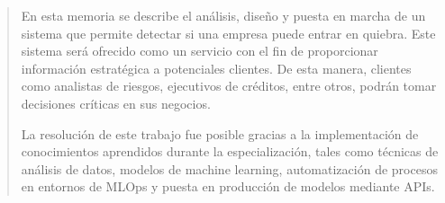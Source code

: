 \documentclass[
    11pt,
    spanish,
    singlespacing,
    parskip,
    headsepline,
    bookmarks=true,
    unicode=true,
    pdftoolbar=true,
    pdfmenubar=true,
    pdffitwindow=false,
    colorlinks=true,
    linkcolor=blue,
    citecolor=blue,
    urlcolor=blue
]{MastersDoctoralThesis}
\def\textbf#1{#1}%
\begin{document}



\frontmatter %
\pagestyle{plain} %


\begin{abstract}
\addchaptertocentry{\abstractname} %
En esta memoria se describe el análisis, diseño y puesta en marcha de un sistema que permite detectar si una empresa puede entrar en quiebra.
Este sistema será ofrecido como un servicio con el fin de proporcionar información estratégica a potenciales clientes. De esta manera, clientes como analistas de riesgos, ejecutivos de créditos, entre otros, podrán tomar decisiones críticas en sus negocios.

La resolución de este trabajo fue posible gracias a la implementación de conocimientos aprendidos durante la especialización, tales como técnicas de análisis de datos, modelos de machine learning, automatización de procesos en entornos de MLOps y puesta en producción de modelos mediante APIs.
\end{abstract}




\tableofcontents
\listoffigures
\listoftables

\end{document}
